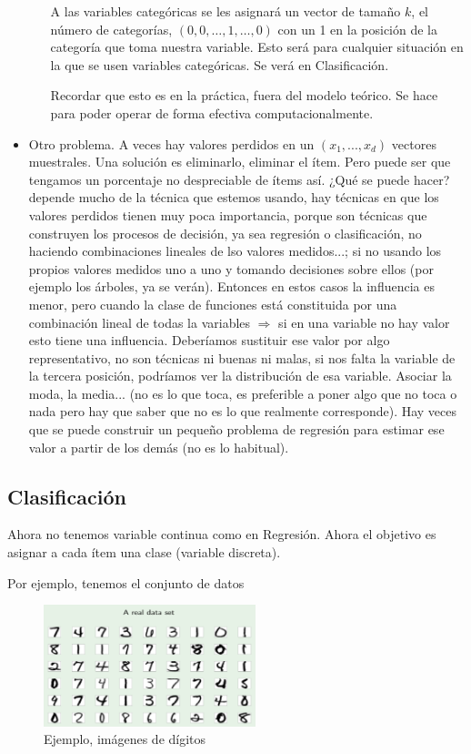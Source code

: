 \documentclass[11pt,a4paper]{article}
\theoremstyle{definition}
\begin{document}
\begin{itemize}
\begin{itemize}
		A las variables categóricas se les asignará un vector de tamaño $k$, el número de categorías, $(0,0,\ldots, 1,\ldots, 0)$ con un 1 en la posición de la categoría que toma nuestra variable. Esto será para cualquier situación en la que se usen variables categóricas. Se verá en Clasificación.
		
		Recordar que esto es en la práctica, fuera del modelo teórico. Se hace para poder operar de forma efectiva computacionalmente.
	\end{itemize}
	
	\item Otro problema. A veces hay valores perdidos en un $(x_1,...,x_d)$ vectores muestrales. Una solución es eliminarlo, eliminar el ítem. Pero puede ser que tengamos un porcentaje no despreciable de ítems así. ¿Qué se puede hacer? depende mucho de la técnica que estemos usando, hay técnicas en que los valores perdidos tienen muy poca importancia, porque son técnicas que construyen los procesos de decisión, ya sea regresión o clasificación, no haciendo combinaciones lineales de lso valores medidos...; si no usando los propios valores medidos uno a uno y tomando decisiones sobre ellos (por ejemplo los árboles, ya se verán). Entonces en estos casos la influencia es menor, pero cuando la clase de funciones está constituida por una combinación lineal de todas la variables $\Rightarrow$ si en una variable no hay valor esto tiene una influencia. Deberíamos sustituir ese valor por algo representativo, no son técnicas ni buenas ni malas, si nos falta la variable de la tercera posición, podríamos ver la distribución de esa variable. Asociar la moda, la media... (no es lo que toca, es preferible a poner algo que no toca o nada pero hay que saber que no es lo que realmente corresponde). Hay veces que se puede construir un pequeño problema de regresión para estimar ese valor a partir de los demás (no es lo habitual).
	
	\end{itemize}
	
	\subsection{Clasificación}
	Ahora no tenemos variable continua como en Regresión. Ahora el objetivo es asignar a cada ítem una clase (variable discreta).
	
	Por ejemplo, tenemos el conjunto de datos 
	
	\begin{figure}[H]
	\centering
	\includegraphics[width=0.55\textwidth]{images/ejemplo_classification}
	\caption{Ejemplo, imágenes de dígitos}
	\end{figure}
	
\end{document}
